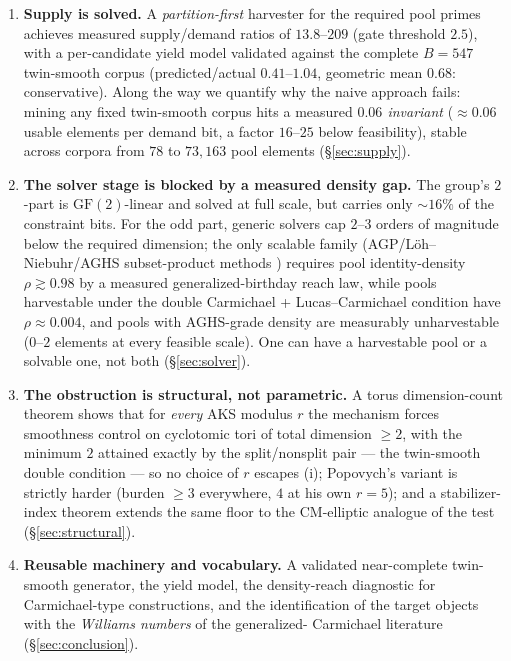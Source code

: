 \documentclass[11pt]{article}
\theoremstyle{remark}
\begin{document}
\begin{enumerate}\itemsep2pt
\item[(i)] \textbf{Supply is solved.} A \emph{partition-first} harvester
for the required pool primes achieves measured supply/demand ratios of
$13.8$--$209$ (gate threshold $2.5$), with a per-candidate yield model
validated against the complete $B = 547$ twin-smooth corpus
(predicted/actual $0.41$--$1.04$, geometric mean $0.68$: conservative).
Along the way we quantify why the naive approach fails: mining any fixed
twin-smooth corpus hits a measured \emph{$0.06$ invariant} ($\approx 0.06$
usable elements per demand bit, a factor $16$--$25$ below feasibility),
stable across corpora from $78$ to $73{,}163$ pool elements
(\S\ref{sec:supply}).
\item[(ii)] \textbf{The solver stage is blocked by a measured density
gap.} The group's $2$-part is $\mathrm{GF}(2)$-linear and solved at full
scale, but carries only ${\sim}16\%$ of the constraint bits. For the odd
part, generic solvers cap $2$--$3$ orders of magnitude below the required
dimension; the only scalable family (AGP/L\"oh--Niebuhr/AGHS
subset-product methods \cite{AGP,LN,AGHS}) requires pool identity-density
$\rho \gtrsim 0.98$ by a measured generalized-birthday reach law, while
pools harvestable under the double Carmichael + Lucas--Carmichael
condition have $\rho \approx 0.004$, and pools with AGHS-grade density are
measurably unharvestable ($0$--$2$ elements at every feasible scale). One
can have a harvestable pool or a solvable one, not both
(\S\ref{sec:solver}).
\item[(iii)] \textbf{The obstruction is structural, not parametric.} A
torus dimension-count theorem shows that for \emph{every} AKS modulus $r$
the mechanism forces smoothness control on cyclotomic tori of total
dimension $\ge 2$, with the minimum $2$ attained exactly by the
split/nonsplit pair --- the twin-smooth double condition --- so no choice
of $r$ escapes (i); Popovych's variant is strictly harder (burden $\ge 3$
everywhere, $4$ at his own $r = 5$); and a stabilizer-index theorem
extends the same floor to the CM-elliptic analogue of the test
(\S\ref{sec:structural}).
\item[(iv)] \textbf{Reusable machinery and vocabulary.} A validated
near-complete twin-smooth generator, the yield model, the density-reach
diagnostic for Carmichael-type constructions, and the identification of
the target objects with the \emph{Williams numbers} of the generalized-%
Carmichael literature \cite{Williams77,Echi07,McIntoshMitra}
(\S\ref{sec:conclusion}).
\end{enumerate}
\end{document}

